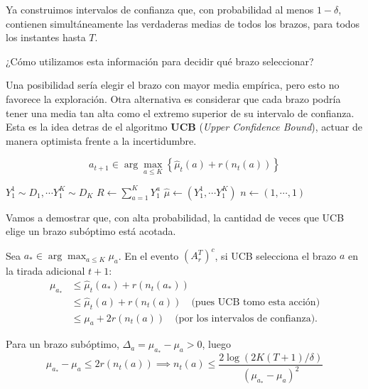 Ya construimos intervalos de confianza que, con probabilidad al menos \(1-\delta\), contienen simultáneamente las verdaderas medias de todos los brazos, para todos los instantes hasta \(T\).

¿Cómo utilizamos esta información para decidir qué brazo seleccionar?

Una posibilidad sería elegir el brazo con mayor media empírica, pero esto no favorece la exploración. Otra alternativa es considerar que cada brazo podría tener una media tan alta como el extremo superior de su intervalo de confianza. Esta es la idea detras de el algoritmo \textbf{UCB} (\textit{Upper Confidence Bound}), actuar de manera optimista frente a la incertidumbre.

\begin{equation}
    a_{t+1}\in\arg\max_{a\le K} \left\{\hat\mu_t(a)+r(n_t(a))\right\}
\end{equation}

\begin{algorithm}[H]
\caption{Algoritmo UCB}

\(Y^1_1 \sim D_1, \cdots Y^K_1 \sim D_K \)\;
\(R \gets \sum^K_{a=1} Y^a_1\)\;
\(\hat{\mu} \gets (Y^1_1, \cdots Y^K_1)\)\;
\(n \gets (1, \cdots, 1)\) \;
\end{algorithm}

Vamos a demostrar que, con alta probabilidad, la cantidad de veces que UCB elige un brazo subóptimo está acotada.

Sea \(a_*\in\arg\max_{a\leq K}\mu_a\). En el evento \((A_r^T)^c\), si UCB selecciona el brazo \(a\) en la tirada adicional \(t+1\):
\[
\begin{aligned}
\mu_{a_*}
&\le \hat\mu_t(a_*)+r(n_t(a_*))\\
&\le \hat\mu_t(a)+r(n_t(a)) \quad \text{(pues UCB tomo esta acción)}\\
&\le \mu_a+2r(n_t(a)) \quad \text{(por los intervalos de confianza).}
\end{aligned}
\]

Para un brazo subóptimo, \(\Delta_a=\mu_{a_*}-\mu_a>0\), luego
\begin{equation}
\mu_{a_*} - \mu_a \leq 2r(n_t(a)) \implies n_t(a) \le \frac{2\log(2K(T+1)/\delta)}{(\mu_{a_*} - \mu_a)^2}
\end{equation}

